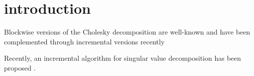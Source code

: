 \section{introduction}
Blockwise versions of the Cholesky decomposition are well-known \textcite{Choi1996} and have been complemented through incremental versions recently \textcite{Polok2013}
 

Recently, an incremental algorithm for singular value decomposition has been proposed \textcite{Iodice2022}.